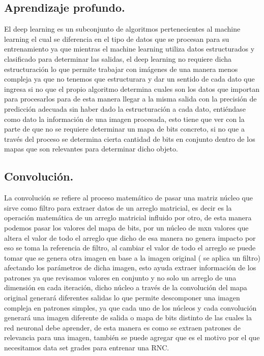 \documentclass[a4paper, 12pt]{article}
\begin{document}
    \subsection{Aprendizaje profundo.}
    El deep learning es un subconjunto de algoritmos pertenecientes al machine learning el cual se diferencia en el tipo de datos que se procesan para su entrenamiento ya que mientras el machine learning utiliza datos estructurados y clasificado para determinar las salidas, el deep learning no requiere dicha estructuración lo que permite trabajar con imágenes de una manera menos compleja ya que no tenemos que estructurara y dar un sentido de cada dato que ingresa si no que el propio algoritmo determina cuales son los datos que importan para procesarlos para de esta manera llegar a la misma salida con la precisión de predicción adecuada sin haber dado la estructuración a cada dato, entiéndase como dato la información de una imagen procesada, esto tiene que ver con la parte de que no se requiere determinar un mapa de bits concreto, si no que a través del proceso se determina cierta cantidad de bits en conjunto dentro de los mapas que son relevantes para determinar dicho objeto. 

    \subsection{Convolución.}
    La convolución se refiere al proceso matemático de pasar una matriz núcleo que sirve como filtro para extraer datos de un arreglo matricial, es decir es la operación matemática de un arreglo matricial influido por otro, de esta manera podemos pasar los valores del mapa de bits, por un núcleo de mxn valores que altera el valor de todo el arreglo que dicho de esa manera no genera impacto por eso se toma la referencia de filtro, al cambiar el valor de todo el arreglo se puede tomar que se genera otra imagen en base a la imagen original ( se aplica un filtro) afectando los parámetros de dicha imagen, esto ayuda extraer información de los patrones ya que revisamos valores en conjunto y no solo un arreglo de una dimensión en cada iteración, dicho núcleo a través de la convolución del mapa original generará diferentes salidas lo que permite descomponer una imagen compleja en patrones simples, ya que cada uno de los núcleos y cada convolución generará una imagen diferente de salida o mapa de bits distinto de las cuales la red neuronal debe aprender, de esta manera es como se extraen patrones de relevancia para una imagen, también se puede agregar que es el motivo por el que necesitamos data set grades para entrenar una RNC. 
\end{document}
